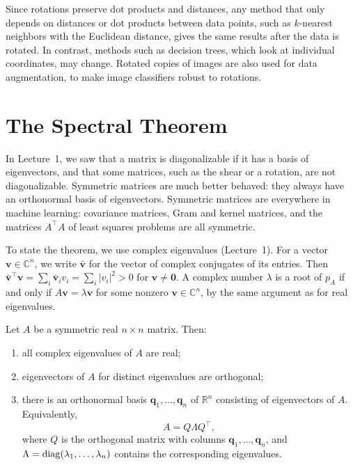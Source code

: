\begin{remark}
    Since rotations preserve dot products and distances, any method that only depends on distances or dot products between data points, such as $k$-nearest neighbors with the Euclidean distance, gives the same results after the data is rotated. In contrast, methods such as decision trees, which look at individual coordinates, may change. Rotated copies of images are also used for data augmentation, to make image classifiers robust to rotations.
\end{remark}

\section{The Spectral Theorem}\label{L2-sec:spectral}

In Lecture~1, we saw that a matrix is diagonalizable if it has a basis of eigenvectors, and that some matrices, such as the shear or a rotation, are not diagonalizable. Symmetric matrices are much better behaved: they always have an orthonormal basis of eigenvectors. Symmetric matrices are everywhere in machine learning: covariance matrices, Gram and kernel matrices, and the matrices $A^\top A$ of least squares problems are all symmetric.

To state the theorem, we use complex eigenvalues (Lecture~1). For a vector $\mathbf{v} \in \mathbb{C}^n$, we write $\bar{\mathbf{v}}$ for the vector of complex conjugates of its entries. Then $\bar{\mathbf{v}}^\top \mathbf{v} = \sum_i \bar{\mathbf{v}}_i v_i = \sum_i |v_i|^2 > 0$ for $\mathbf{v} \neq \mathbf{0}$. A complex number $\lambda$ is a root of $p_A$ if and only if $A\mathbf{v} = \lambda \mathbf{v}$ for some nonzero $\mathbf{v} \in \mathbb{C}^n$, by the same argument as for real eigenvalues.

\begin{theorem}\label{L2-thm:spectral}
    Let $A$ be a symmetric real $n \times n$ matrix. Then:
    \begin{enumerate}
        \item all complex eigenvalues of $A$ are real;
        \item eigenvectors of $A$ for distinct eigenvalues are orthogonal;
        \item there is an orthonormal basis $\mathbf{q}_1, \ldots, \mathbf{q}_n$ of $\mathbb{R}^n$ consisting of eigenvectors of $A$. Equivalently,
        \[A = Q \Lambda Q^\top,\]
        where $Q$ is the orthogonal matrix with columns $\mathbf{q}_1, \ldots, \mathbf{q}_n$, and $\Lambda = \operatorname{diag}(\lambda_1, \ldots, \lambda_n)$ contains the corresponding eigenvalues.
    \end{enumerate}
\end{theorem}

